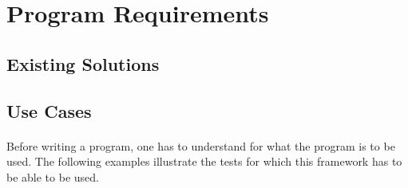 \section{Program Requirements}

\subsection{Existing Solutions}
\paragraph{}


\subsection{Use Cases}
\paragraph{}
Before writing a program, one has to understand for what the program is to be used. The following examples illustrate the tests for which this framework has to be able to be used.

